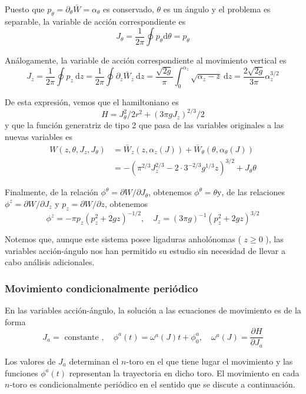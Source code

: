 Puesto que $p_{\theta}=\partial_{\theta} \bar{W}=\alpha_{\theta}$ es conservado, $\theta$ es un ángulo y el problema es separable, la variable de acción correspondiente es
$$
J_{\theta}=\frac{1}{2 \pi} \oint p_{\theta} \mathrm{d} \theta=p_{\theta}
$$

Análogamente, la variable de acción correspondiente al movimiento vertical es
$$
J_{z}=\frac{1}{2 \pi} \oint p_{z} \mathrm{~d} z=\frac{1}{2 \pi} \oint \partial_{z} \bar{W}_{z} \mathrm{~d} z=\frac{\sqrt{2 g}}{\pi} \int_{0}^{\alpha_{z}} \sqrt{\alpha_{z}-z} \mathrm{~d} z=\frac{2 \sqrt{2 g}}{3 \pi} \alpha_{z}^{3 / 2}
$$

De esta expresión, vemos que el hamiltoniano es
$$
H=J_{\theta}^{2} / 2 r^{2}+\left(3 \pi g J_{z}\right)^{2 / 3} / 2
$$
y que la función generatriz de tipo 2 que pasa de las variables originales a las nuevas variables es
$$
\begin{aligned}
W\left(z, \theta, J_{z}, J_{\theta}\right) & =\bar{W}_{z}\left(z, \alpha_{z}(J)\right)+\bar{W}_{\theta}\left(\theta, \alpha_{\theta}(J)\right) \\
& =-\left(\pi^{2 / 3} J_{z}^{2 / 3}-2 \cdot 3^{-2 / 3} g^{1 / 3} z\right)^{3 / 2}+J_{\theta} \theta
\end{aligned}
$$

Finalmente, de la relación $\phi^{\theta}=\partial W / \partial J_{\theta}$, obtenemos $\phi^{\theta}=\theta \mathrm{y}$, de las relaciones $\phi^{z}=\partial W / \partial J_{z}$ y $p_{z}=\partial W / \partial z$, obtenemos
$$
\phi^{z}=-\pi p_{z}\left(p_{z}^{2}+2 g z\right)^{-1 / 2}, \quad J_{z}=(3 \pi g)^{-1}\left(p_{z}^{2}+2 g z\right)^{3 / 2}
$$

Notemos que, aunque este sistema posee ligaduras anholónomas ( $z \geq 0$ ), las variables acción-ángulo nos han permitido su estudio sin necesidad de llevar a cabo análisis adicionales.
\subsubsection{Movimiento condicionalmente periódico}



En las variables acción-ángulo, la solución a las ecuaciones de movimiento es de la forma
$$
J_{a}=\text { constante }, \quad \phi^{a}(t)=\omega^{a}(J) t+\phi_{0}^{a}, \quad \omega^{a}(J)=\frac{\partial H}{\partial J_{a}}
$$

Los valores de $J_{a}$ determinan el $n$-toro en el que tiene lugar el movimiento y las funciones $\phi^{a}(t)$ representan la trayectoria en dicho toro. El movimiento en cada $n$-toro es condicionalmente periódico en el sentido que se discute a continuación.

